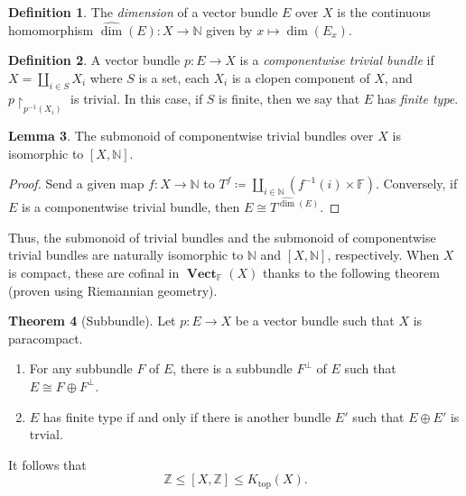 \documentclass[10pt,letterpaper,cm]{nupset}
\theoremstyle{definition}
\newtheorem{definition}{Definition}[section]
\theoremstyle{theorem}
\newtheorem{theorem}[definition]{Theorem}
\newtheorem{lemma}[definition]{Lemma}
\theoremstyle{remark}
\newcommand{\F}{\mathbb F}
\newcommand{\N}{\mathbb N}
\newcommand{\Z}{\mathbb Z}
\newcommand{\1}{\mathbf{1}}
\newcommand{\0}{\vec 0}
\DeclareMathOperator{\vect}{\mathbf{Vect}}
\DeclareMathOperator{\topp}{\mathrm{top}}
\begin{document}
\begin{definition}
The \textit{dimension} of a vector bundle $E$ over $X$ is the continuous homomorphism $\widehat{\dim}(E) : X \to \N$ given by $x \mapsto \dim(E_x)$.
\end{definition}

\begin{definition}
A vector bundle $p: E \to X$ is a \textit{componentwise trivial bundle} if  $X =\coprod_{i\in S} X_i$ where $S$ is a set, each $X_i$ is a clopen component of $X$, and $p\restriction_{p^{{-1}}(X_i)}$ is trivial.
In this case, if $S$ is finite, then we say that $E$ has \textit{finite type}.
\end{definition}

\begin{lemma}
The submonoid of componentwise trivial bundles over $X$ is isomorphic to $\left[X, \N\right]$.
\end{lemma}
\begin{proof}
Send a given map $f: X \to \N$ to $T^f \coloneqq \coprod_{i \in \N}\left(f^{{-1}}(i) \times \F\right)$. Conversely, if $E$ is a componentwise trivial bundle, then $E \cong T^{\widehat{\dim}(E)}$.
\end{proof}


Thus, the submonoid  of trivial bundles and the submonoid of componentwise trivial bundles are naturally isomorphic to $\N$ and $\left[X, \N\right]$, respectively.  When $X$ is compact, these are cofinal in $\vect_{\F}(X)$ thanks to the following theorem (proven using Riemannian geometry). 

\begin{theorem}[Subbundle]
Let $p: E \to X$ be a vector bundle such that $X$ is paracompact.
\begin{enumerate}[label=(\alph*)]
\item For any subbundle $F$ of $E$, there is a subbundle $F^{\perp}$ of $E$ such that $E \cong F \oplus F^{\perp}$.
\item $E$ has finite type if and only if there is another bundle $E'$ such that $E\oplus E'$ is trvial.
\end{enumerate}
\end{theorem}

It follows that $$\Z \leq \left[X, \Z\right] \leq K_{\topp}(X).$$

\medskip
\end{document}
